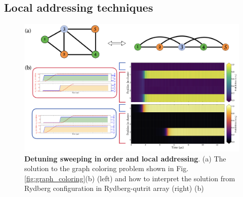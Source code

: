\documentclass[%
 reprint,
nofootinbib,
 amsmath,amssymb,
 aps,
floatfix,
]{revtex4-2}
\begin{document}
\subsection{Local addressing techniques}
\begin{figure}[t!]
    \centering
    \includegraphics[width=13cm]{picture/case1_ultimate.png}
    \caption{\textbf{Detuning sweeping in order and local addressing}. (a) The solution to the graph coloring problem shown in Fig.\ref{fig:graph_coloring}(b) (left) and how to interpret the solution from Rydberg configuration in Rydberg-qutrit array (right) (b) }
    \label{fig:case1_ultimate}
\end{figure}
\end{document}
